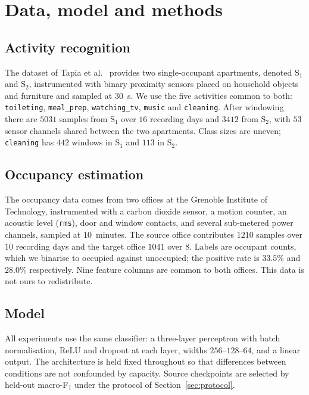 \documentclass[a4paper,fleqn]{cas-dc}
\newcommand{\macf}{macro-F\textsubscript{1}}
\begin{document}
\section{Data, model and methods}
\label{sec:data}

\subsection{Activity recognition}

The dataset of Tapia et al.~\cite{tapia2004} provides two single-occupant apartments,
denoted $\text{S}_1$ and $\text{S}_2$, instrumented with binary proximity sensors placed on
household objects and furniture and sampled at $30$~s. We use the five activities common to
both: \texttt{toileting}, \texttt{meal\_prep}, \texttt{watching\_tv}, \texttt{music} and
\texttt{cleaning}. After windowing there are $5031$ samples from $\text{S}_1$ over $16$
recording days and $3412$ from $\text{S}_2$, with $53$ sensor channels shared between the
two apartments. Class sizes are uneven; \texttt{cleaning} has $442$ windows in
$\text{S}_1$ and $113$ in $\text{S}_2$.

\subsection{Occupancy estimation}

The occupancy data comes from two offices at the Grenoble Institute of Technology,
instrumented with a carbon dioxide sensor, a motion counter, an acoustic
level (\texttt{rms}), door and window contacts, and several sub-metered power channels,
sampled at $10$~minutes. The source office contributes $1210$ samples over $10$ recording
days and the target office $1041$ over $8$. Labels are occupant counts, which we binarise
to occupied against unoccupied; the positive rate is $33.5\%$ and $28.0\%$ respectively.
Nine feature columns are common to both offices. This data is not ours to redistribute.

\subsection{Model}

All experiments use the same classifier: a three-layer perceptron with batch normalisation,
ReLU and dropout at each layer, widths $256$--$128$--$64$, and a linear output. The
architecture is held fixed throughout so that differences between conditions are not
confounded by capacity. Source checkpoints are selected by held-out \macf{} under the
protocol of Section~\ref{sec:protocol}.
\end{document}
